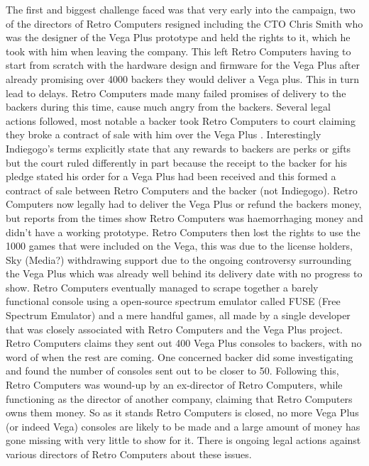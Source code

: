 The first and biggest challenge faced was that very early into the campaign, two of the directors of Retro Computers resigned including the CTO Chris Smith who was the designer of the Vega Plus prototype and held the rights to it, which he took with him when leaving the company. This left Retro Computers having to start from scratch with the hardware design and firmware for the Vega Plus after already promising over 4000 backers they would deliver a Vega plus. This in turn lead to delays. Retro Computers made many failed promises of delivery to the backers during this time, cause much angry from the backers. Several legal actions followed, most notable a backer took Retro Computers to court claiming they broke a contract of sale with him over the Vega Plus 
\cite{RN122}. Interestingly Indiegogo's terms explicitly state that any rewards to backers are perks or gifts but the court ruled differently in part because the receipt to the backer for his pledge stated his order for a Vega Plus had been received and this formed a contract of sale between Retro Computers and the backer (not Indiegogo). Retro Computers now legally had to deliver the Vega Plus or refund the backers money, but reports from the times show Retro Computers was haemorrhaging money and didn't have a working prototype. Retro Computers then lost the rights to use the 1000 games that were included on the Vega, this was due to the license holders, Sky (Media?) withdrawing support due to the ongoing controversy surrounding the Vega Plus which was already well behind its delivery date with no progress to show. Retro Computers eventually managed to scrape together a barely functional console using a open-source spectrum emulator called FUSE (Free Spectrum Emulator) and a mere handful games, all made by a single developer that was closely associated with Retro Computers and the Vega Plus project. Retro Computers claims they sent out 400 Vega Plus consoles to backers, with no word of when the rest are coming. One concerned backer did some investigating and found the number of consoles sent out to be closer to 50. Following this, Retro Computers was wound-up by an ex-director of Retro Computers, while functioning as the director of another company, claiming that Retro Computers owns them money. So as it stands Retro Computers is closed, no more Vega Plus (or indeed Vega) consoles are likely to be made and a large amount of money has gone missing with very little to show for it. There is ongoing legal actions against various directors of Retro Computers about these issues.\\

